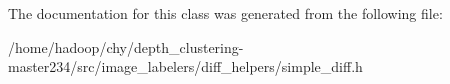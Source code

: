 The documentation for this class was generated from the following file\-:\begin{DoxyCompactItemize}
\item 
/home/hadoop/chy/depth\-\_\-clustering-\/master234/src/image\-\_\-labelers/diff\-\_\-helpers/simple\-\_\-diff.\-h\end{DoxyCompactItemize}
